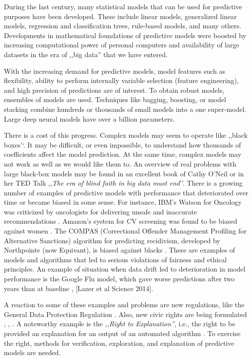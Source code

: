 \documentclass[12pt,]{krantz}
\begin{document}
During the last century, many statistical models that can be used for predictive purposes have been developed. These include linear models, generalized linear models, regression and classification trees, rule-based models, and many others. Developments in mathematical foundations of predictive models were boosted by increasing computational power of personal computers and availability of large datasets in the era of ,,big data'' that we have entered.

With the increasing demand for predictive models, model features such as flexibility, ability to perform internally variable selection (feature engineering), and high precision of predictions are of interest. To obtain robust models, ensembles of models are used. Techniques like bagging, boosting, or model stacking combine hundreds or thousands of small models into a one super-model. Large deep neural models have over a billion parameters.

There is a cost of this progress. Complex models may seem to operate like ,,black boxes'`. It may be difficult, or even impossible, to understand how thousands of coefficients affect the model prediction. At the same time, complex models may not work as well as we would like them to. An overview of real problems with large black-box models may be found in an excellent book of Cathy O'Neil \citep{ONeil} or in her TED Talk ,,\emph{The era of blind faith in big data must end}''. There is a growing number of examples of predictive models with performance that deteriorated over time or became biased in some sense. For instance, IBM's Watson for Oncology was criticized by oncologists for delivering unsafe and inaccurate recommendations \citep{IBMWatson}. Amazon's system for CV screening was found to be biased against women \citep{AmazonAI}. The COMPAS (Correctional Offender Management Profiling for Alternative Sanctions) algorithm for predicting recidivism, developed by Northpointe (now Equivant), is biased against blacks \citep{COMPAS}. These are examples of models and algorithms that led to serious violations of fairness and ethical principles. An example of situation when data drift led to deterioration in model performance is the Google Flu model, which gave worse predictions after two years than at baseline \citep{GoogleFLU}, {[}Lazer et al Science 2014{]}.

A reaction to some of these examples and problems are new regulations, like the General Data Protection Regulation \citep{EUGDPR}. Also, new civic rights are being formulated \citep{RightToExpl}, \citep{RightToExpl2}, \citep{RightToExpl3}. A noteworthy example is the \emph{,,Right to Explanation''}, i.e., the right to be provided an explanation for an output of an automated algorithm \citep{RightToExpl}. To exercise the right, methods for verification, exploration, and explanation of predictive models are needed.
\end{document}
